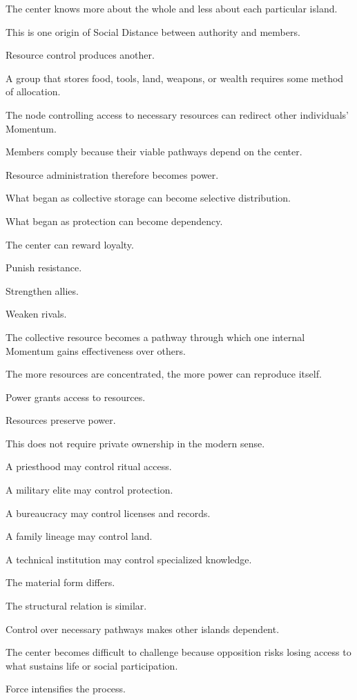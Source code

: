 The center knows more about the whole and less about each particular island.

This is one origin of Social Distance between authority and members.

Resource control produces another.

A group that stores food, tools, land, weapons, or wealth requires some method of allocation.

The node controlling access to necessary resources can redirect other individuals’ Momentum.

Members comply because their viable pathways depend on the center.

Resource administration therefore becomes power.

What began as collective storage can become selective distribution.

What began as protection can become dependency.

The center can reward loyalty.

Punish resistance.

Strengthen allies.

Weaken rivals.

The collective resource becomes a pathway through which one internal Momentum gains effectiveness over others.

The more resources are concentrated, the more power can reproduce itself.

Power grants access to resources.

Resources preserve power.

This does not require private ownership in the modern sense.

A priesthood may control ritual access.

A military elite may control protection.

A bureaucracy may control licenses and records.

A family lineage may control land.

A technical institution may control specialized knowledge.

The material form differs.

The structural relation is similar.

Control over necessary pathways makes other islands dependent.

The center becomes difficult to challenge because opposition risks losing access to what sustains life or social participation.

Force intensifies the process.

